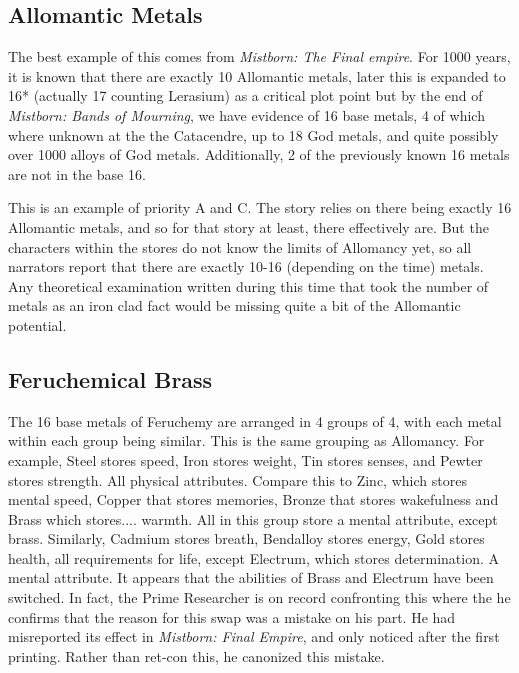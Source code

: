 \documentclass[conference]{IEEEtran}
\begin{document}
\subsection*{Allomantic Metals}
The best example of this comes from \emph{Mistborn: The Final empire}.  For 1000 years, it is known that there are exactly 10 Allomantic metals,\cite{kelsier} later this is expanded to 16* (actually 17 counting Lerasium) as a critical plot point\cite{16-metals} but by the end of \emph{Mistborn: Bands of Mourning}, we have evidence of 16 base metals, 4 of which where unknown at the the Catacendre, up to 18 God metals, and quite possibly over 1000 alloys of God metals. \cite{bands}\cite{larasium}\cite{dor}  Additionally, 2 of the previously known 16 metals are not in the base 16.\cite{nalatium}

This is an example of priority A and C.  The story relies on there being exactly 16 Allomantic metals, and so for that story at least, there effectively are.  But the characters within the stores do not know the limits of Allomancy yet, so all narrators report that there are exactly 10-16 (depending on the time) metals.  Any theoretical examination written during this time that took the number of metals as an iron clad fact would be missing quite a bit of the Allomantic potential.

\subsection*{Feruchemical Brass}
The 16 base metals of Feruchemy are arranged in 4 groups of 4,\cite{feruchemy}  with each metal within each group being similar.  This is the same grouping as Allomancy. For example, Steel stores speed, Iron stores weight, Tin stores senses, and Pewter stores strength.  All physical attributes.  Compare this to Zinc, which stores mental speed, Copper that stores memories, Bronze that stores wakefulness and Brass which stores.... warmth.  All in this group store a mental attribute, except brass.  Similarly, Cadmium stores breath, Bendalloy stores energy, Gold stores health, all requirements for life, except Electrum, which stores determination.  A mental attribute.  It appears that the abilities of Brass and Electrum have been switched.  In fact, the Prime Researcher is on record confronting this\cite{mistake} where the he confirms that the reason for this swap was a mistake on his part.  He had misreported its effect in \emph{Mistborn: Final Empire}, and only noticed after the first printing.  Rather than ret-con this, he canonized this mistake.
\end{document}
